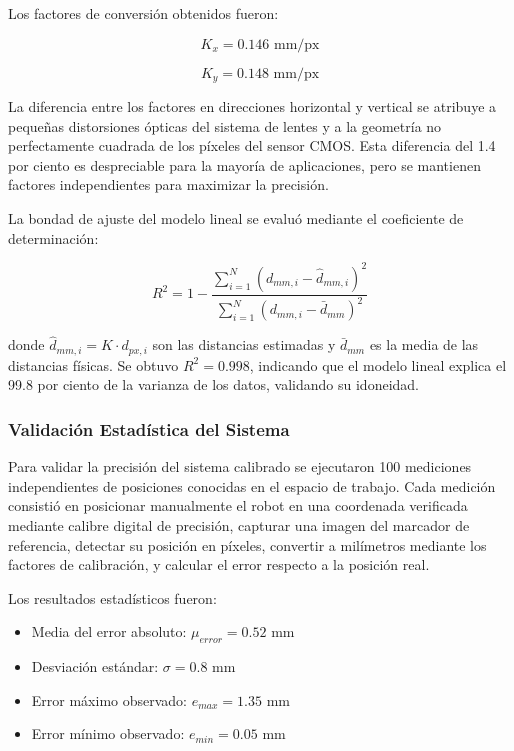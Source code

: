 Los factores de conversión obtenidos fueron:

\begin{equation}
K_x = 0.146 \text{ mm/px}
\end{equation}

\begin{equation}
K_y = 0.148 \text{ mm/px}
\end{equation}

La diferencia entre los factores en direcciones horizontal y vertical se atribuye a pequeñas distorsiones ópticas del sistema de lentes y a la geometría no perfectamente cuadrada de los píxeles del sensor CMOS. Esta diferencia del 1.4 por ciento es despreciable para la mayoría de aplicaciones, pero se mantienen factores independientes para maximizar la precisión.

La bondad de ajuste del modelo lineal se evaluó mediante el coeficiente de determinación:

\begin{equation}
R^2 = 1 - \frac{\sum_{i=1}^{N}(d_{mm,i} - \hat{d}_{mm,i})^2}{\sum_{i=1}^{N}(d_{mm,i} - \bar{d}_{mm})^2}
\end{equation}

donde $\hat{d}_{mm,i} = K \cdot d_{px,i}$ son las distancias estimadas y $\bar{d}_{mm}$ es la media de las distancias físicas. Se obtuvo $R^2 = 0.998$, indicando que el modelo lineal explica el 99.8 por ciento de la varianza de los datos, validando su idoneidad.

\subsubsection{Validación Estadística del Sistema}

Para validar la precisión del sistema calibrado se ejecutaron 100 mediciones independientes de posiciones conocidas en el espacio de trabajo. Cada medición consistió en posicionar manualmente el robot en una coordenada verificada mediante calibre digital de precisión, capturar una imagen del marcador de referencia, detectar su posición en píxeles, convertir a milímetros mediante los factores de calibración, y calcular el error respecto a la posición real.

Los resultados estadísticos fueron:

\begin{itemize}
\item Media del error absoluto: $\mu_{error} = 0.52$ mm
\item Desviación estándar: $\sigma = 0.8$ mm  
\item Error máximo observado: $e_{max} = 1.35$ mm
\item Error mínimo observado: $e_{min} = 0.05$ mm
\end{itemize}

